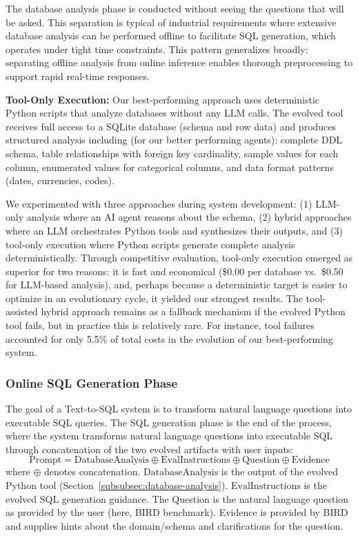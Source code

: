 \documentclass{article}
\begin{document}
The database analysis phase is conducted without seeing the questions that will be asked. This separation is typical of industrial requirements where extensive database analysis can be performed offline to facilitate SQL generation, which operates under tight time constraints. This pattern generalizes broadly: separating offline analysis from online inference enables thorough preprocessing to support rapid real-time responses.

\textbf{Tool-Only Execution:} Our best-performing approach uses deterministic Python scripts that analyze databases without any LLM calls. The evolved tool receives full access to a SQLite database (schema and row data) and produces structured analysis including (for our better performing agents): complete DDL schema, table relationships with foreign key cardinality, sample values for each column, enumerated values for categorical columns, and data format patterns (dates, currencies, codes).

We experimented with three approaches during system development: (1) LLM-only analysis where an AI agent reasons about the schema, (2) hybrid approaches where an LLM orchestrates Python tools and synthesizes their outputs, and (3) tool-only execution where Python scripts generate complete analysis deterministically. Through competitive evaluation, tool-only execution emerged as superior for two reasons: it is fast and economical (\$0.00 per database vs.\ \$0.50 for LLM-based analysis), and, perhaps because a deterministic target is easier to optimize in an evolutionary cycle, it yielded our strongest results. 
The tool-assisted hybrid approach remains as a fallback mechanism if the evolved Python tool fails, but in practice this is relatively rare. For instance, tool failures accounted for only 5.5\% of total costs in the evolution of our best-performing system.

\subsubsection{Online SQL Generation Phase}
\label{subsubsec:sql-gen}

The goal of a Text-to-SQL system is to transform natural language questions into executable SQL queries. The SQL generation phase is the end of the process, where the system transforms natural language questions into executable SQL through concatenation of the two evolved artifacts with user inputs:
$$\text{Prompt} = \text{DatabaseAnalysis} \oplus \text{EvalInstructions} \oplus \text{Question} \oplus \text{Evidence}$$
where $\oplus$ denotes concatenation. $\text{DatabaseAnalysis}$ is the output of the evolved Python tool (Section~\ref{subsubsec:database-analysis}). $\text{EvalInstructions}$ is the evolved SQL generation guidance. The Question is the natural language question as provided by the user (here, BIRD benchmark). Evidence is provided by BIRD and supplies hints about the domain/schema and clarifications for the question.
\end{document}

